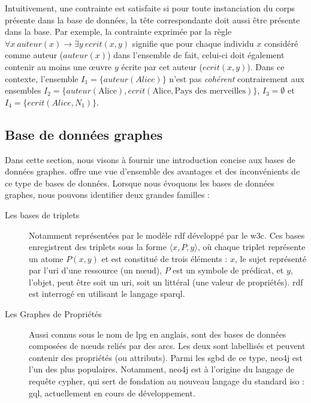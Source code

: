 Intuitivement, une contrainte est satisfaite si pour toute instanciation du corps présente dans la base de données, la tête correspondante doit aussi être présente dans la base.
Par exemple, la contrainte exprimée par la règle $\forall x~auteur(x) \to \exists y~ecrit(x,y)$ signifie que pour chaque individu $x$ considéré comme auteur ($auteur(x)$) dans l'ensemble de fait, celui-ci doit également contenir au moins une œuvre $y$ écrite par cet auteur ($ecrit(x,y)$).
Dans ce contexte, l'ensemble $I_1 = \{auteur(Alice)\}$ n'est pas \emph{cohérent} contrairement aux ensembles $I_2 = \{auteur(\text{Alice}), ecrit(\text{Alice}, \text{Pays des merveilles})\}$, $I_3 = \emptyset$ et $I_4 = \{ecrit(Alice, N_1)\}$.

\subsection{Base de données graphes}
\label{sec:update:pre:graph}

Dans cette section, nous visons à fournir une introduction concise aux bases de données graphes.
\cite{pokornyGraphDatabasesTheir2015} offre une vue d'ensemble des avantages et des inconvénients de ce type de bases de données.
Lorsque nous évoquons les bases de données graphes, nous pouvons identifier deux grandes familles :
\begin{description}
    \item[Les bases de triplets] Notamment représentées par le modèle \gls{rdf} développé par le \gls{w3c}.
          Ces bases enregistrent des triplets sous la forme $\langle x, P, y \rangle$, où chaque triplet représente un atome $P(x, y)$ et est constitué de trois éléments : $x$, le sujet représenté par l'\gls{uri} d'une ressource (un nœud), $P$ est un symbole de prédicat, et $y$, l'objet, peut être soit un \gls{uri}, soit un littéral (une valeur de propriétés).
          \acs{rdf} est interrogé en utilisant le langage \gls{sparql}.

    \item[Les Graphes de Propriétés] Aussi connus sous le nom de \gls{lpg} en anglais, sont des bases de données composées de nœuds reliés par des arcs. Les deux sont labellisés et peuvent contenir des propriétés (ou attributs).
          Parmi les \gls{sgbd} de ce type, \gls{neo4j} est l'un des plus populaires.
          Notamment, \gls{neo4j} est à l'origine du langage de requête \gls{cypher}, qui sert de fondation au nouveau langage du standard \gls{iso} : \gls{gql}, actuellement en cours de développement.
\end{description}

